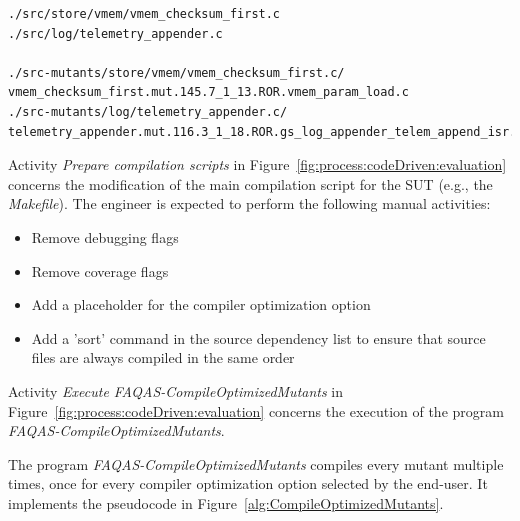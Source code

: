\begin{verbatim}
./src/store/vmem/vmem_checksum_first.c
./src/log/telemetry_appender.c

./src-mutants/store/vmem/vmem_checksum_first.c/
vmem_checksum_first.mut.145.7_1_13.ROR.vmem_param_load.c
./src-mutants/log/telemetry_appender.c/
telemetry_appender.mut.116.3_1_18.ROR.gs_log_appender_telem_append_isr.c
\end{verbatim}





\RQ{} Activity \emph{Prepare compilation scripts} in Figure~\ref{fig:process:codeDriven:evaluation} concerns the modification of the main compilation script for the SUT (e.g., the \emph{Makefile}). The engineer is expected to perform the following manual activities:
\begin{itemize}
\item Remove debugging flags
\item Remove coverage flags
\item Add a placeholder for the compiler optimization option
\item Add a 'sort' command in the source dependency list to ensure that source files are always compiled in the same order
\end{itemize}



\RQ{} Activity \emph{Execute FAQAS-CompileOptimizedMutants} in Figure~\ref{fig:process:codeDriven:evaluation} concerns the execution of the program \emph{FAQAS-CompileOptimizedMutants}.

\RQ{} The program \emph{FAQAS-CompileOptimizedMutants} compiles every mutant multiple times, once for every compiler optimization option selected by the end-user. It implements the pseudocode in Figure~\ref{alg:CompileOptimizedMutants}.

